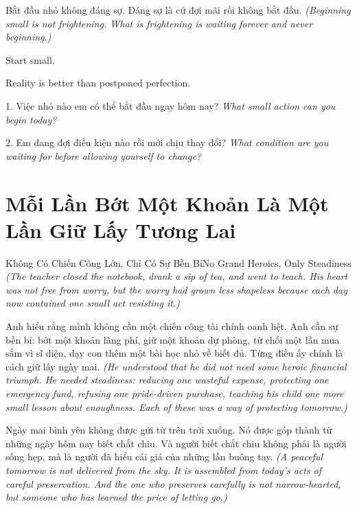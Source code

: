 \begin{baihoc}
Bắt đầu nhỏ không đáng sợ. Đáng sợ là cứ đợi mãi rồi không bắt đầu.
\textit{(Beginning small is not frightening. What is frightening is waiting forever and never beginning.)}
\end{baihoc}

\begin{ghinhoanh}
Start small.

Reality is better than postponed perfection.
\end{ghinhoanh}

\begin{tuhocnhanh}
1. Việc nhỏ nào em có thể bắt đầu ngay hôm nay? \textit{What small action can you begin today?}

2. Em đang đợi điều kiện nào rồi mới chịu thay đổi? \textit{What condition are you waiting for before allowing yourself to change?}
\end{tuhocnhanh}
\ngancach

\section{Mỗi Lần Bớt Một Khoản Là Một Lần Giữ Lấy Tương Lai}
\begin{truyen}{Không Có Chiến Công Lớn, Chỉ Có Sự Bền Bỉ}{No Grand Heroics, Only Steadiness}
\textit{(The teacher closed the notebook, drank a sip of tea, and went to teach. His heart was not free from worry, but the worry had grown less shapeless because each day now contained one small act resisting it.)}

Anh hiểu rằng mình không cần một chiến công tài chính oanh liệt. Anh cần sự bền bỉ: bớt một khoản lãng phí, giữ một khoản dự phòng, từ chối một lần mua sắm vì sĩ diện, dạy con thêm một bài học nhỏ về biết đủ. Từng điều ấy chính là cách giữ lấy ngày mai.
\textit{(He understood that he did not need some heroic financial triumph. He needed steadiness: reducing one wasteful expense, protecting one emergency fund, refusing one pride-driven purchase, teaching his child one more small lesson about enoughness. Each of these was a way of protecting tomorrow.)}

Ngày mai bình yên không được gửi từ trên trời xuống. Nó được góp thành từ những ngày hôm nay biết chắt chiu. Và người biết chắt chiu không phải là người sống hẹp, mà là người đã hiểu cái giá của những lần buông tay.
\textit{(A peaceful tomorrow is not delivered from the sky. It is assembled from today’s acts of careful preservation. And the one who preserves carefully is not narrow-hearted, but someone who has learned the price of letting go.)}
\end{truyen}

